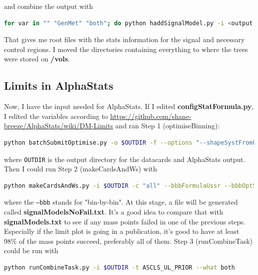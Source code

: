 and combine the output with

\begin{lstlisting}[belowskip=-0.7cm, language=sh, numbers=none]
for var in "" "GenMet" "both"; do python haddSignalModel.py -i <output dir from previous step>/T2ttOutput${var} -f; done
\end{lstlisting}

That gives me root files with the stats information for the signal and necessary control regions. I moved the directories containing everything to where the trees were stored on \textbf{/vols}.


\subsection{Limits in AlphaStats}

Now, I have the input needed for AlphaStats. If I edited \textbf{configStatFormula.py}, I edited the variables according to \url{https://github.com/shane-breeze/AlphaStats/wiki/DM-Limits} and ran Step 1 (optimiseBinning):

\begin{lstlisting}[belowskip=-0.7cm, language=sh, numbers=none]
python batchSubmitOptimise.py -o $OUTDIR -f --options "--shapeSystFromFile --getDataLumi --runFormula  --extrapolateZinv --greenBand" --submit
\end{lstlisting}

where \texttt{OUTDIR} is the output directory for the datacards and AlphaStats output. Then I could run Step 2 (makeCardsAndWs) with

\begin{lstlisting}[belowskip=-0.7cm, language=sh, numbers=none]
python makeCardsAndWs.py -i $OUTDIR -c "all" --bbbFormulaUssr --bbbOptSig
\end{lstlisting}

where the \texttt{--bbb} stands for "bin-by-bin". At this stage, a file will be generated called \textbf{signalModelsNoFail.txt}. It's a good idea to compare that with \textbf{signalModels.txt} to see if any mass points failed in one of the previous steps. Especially if the limit plot is going in a publication, it's good to have at least 98\% of the mass points succeed, preferably all of them. Step 3 (runCombineTask) could be run with

\begin{lstlisting}[belowskip=-0.7cm, language=sh, numbers=none]
python runCombineTask.py -i $OUTDIR -t ASCLS_UL_PRIOR --what both
\end{lstlisting}

